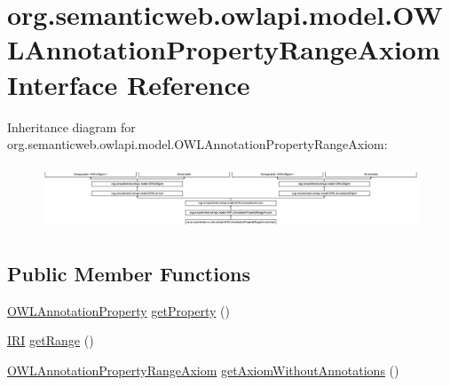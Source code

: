 \hypertarget{interfaceorg_1_1semanticweb_1_1owlapi_1_1model_1_1_o_w_l_annotation_property_range_axiom}{\section{org.\-semanticweb.\-owlapi.\-model.\-O\-W\-L\-Annotation\-Property\-Range\-Axiom Interface Reference}
\label{interfaceorg_1_1semanticweb_1_1owlapi_1_1model_1_1_o_w_l_annotation_property_range_axiom}
}
Inheritance diagram for org.\-semanticweb.\-owlapi.\-model.\-O\-W\-L\-Annotation\-Property\-Range\-Axiom\-:\begin{figure}[H]
\begin{center}
\leavevmode
\includegraphics[height=1.939954cm]{interfaceorg_1_1semanticweb_1_1owlapi_1_1model_1_1_o_w_l_annotation_property_range_axiom}
\end{center}
\end{figure}
\subsection*{Public Member Functions}
\begin{DoxyCompactItemize}
\item 
\hyperlink{interfaceorg_1_1semanticweb_1_1owlapi_1_1model_1_1_o_w_l_annotation_property}{O\-W\-L\-Annotation\-Property} \hyperlink{interfaceorg_1_1semanticweb_1_1owlapi_1_1model_1_1_o_w_l_annotation_property_range_axiom_af81500fb829525f1b7574f423392215e}{get\-Property} ()
\item 
\hyperlink{classorg_1_1semanticweb_1_1owlapi_1_1model_1_1_i_r_i}{I\-R\-I} \hyperlink{interfaceorg_1_1semanticweb_1_1owlapi_1_1model_1_1_o_w_l_annotation_property_range_axiom_a561bbcb9b230805b203c11c845b88c71}{get\-Range} ()
\item 
\hyperlink{interfaceorg_1_1semanticweb_1_1owlapi_1_1model_1_1_o_w_l_annotation_property_range_axiom}{O\-W\-L\-Annotation\-Property\-Range\-Axiom} \hyperlink{interfaceorg_1_1semanticweb_1_1owlapi_1_1model_1_1_o_w_l_annotation_property_range_axiom_a767510cdf7602e70c2a97d76fa0ab371}{get\-Axiom\-Without\-Annotations} ()
\end{DoxyCompactItemize}


